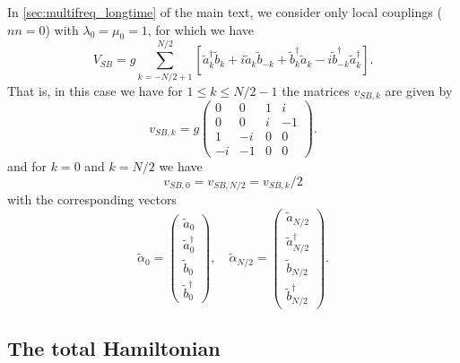 In \cref{sec:multifreq_longtime} of the main text, we consider only local couplings ($nn=0$) with $\lambda_0=\mu_0=1$, for which we have
\begin{equation}
    \label{eq:local_coupling_nn0}
    V_{SB} = g\sum_{k=-N/2+1}^{N/2} [\tilde{a}_k^\dagger \tilde{b}_k + i\tilde{a}_k \tilde{b}_{-k} + \tilde{b}_k^\dagger \tilde{a}_k - i\tilde{b}_{-k}^\dagger \tilde{a}_k^\dagger].
\end{equation}
That is, in this case we have for $1 \leq k \leq N/2-1$ the matrices $v_{SB,k}$ are given by
\begin{equation}
    v_{SB,k} = g\begin{pmatrix}
        0  &0  &1 &i\\
        0  &0  &i &-1\\
        1  &-i &0 &0\\
        -i &-1 &0 &0
    \end{pmatrix}.\label{eq:vSB_k}
\end{equation}
and for $k=0$ and $k=N/2$ we have
\begin{equation}
    v_{SB,0} = v_{SB,N/2} = v_{SB,k}/2
    \label{eq:vSB_0}
\end{equation}
with the corresponding vectors
\begin{equation}
    \tilde{\alpha}_0 = \begin{pmatrix}
        \tilde{a}_0\\
        \tilde{a}_0^\dagger\\
        \tilde{b}_0\\
        \tilde{b}_0^\dagger
    \end{pmatrix},\quad \tilde{\alpha}_{N/2} = \begin{pmatrix}
        \tilde{a}_{N/2}\\
        \tilde{a}_{N/2}^\dagger\\
        \tilde{b}_{N/2}\\
        \tilde{b}_{N/2}^\dagger
    \end{pmatrix}.
\end{equation}


\subsection{The total Hamiltonian}

